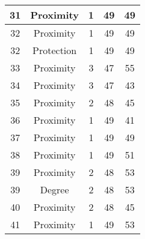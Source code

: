 \documentclass[results.tex]{subfiles}
\begin{document}
\begin{center}
\begin{tabular}{| c || c | c | c | c |}
            \hline
            31                      & Proximity                    & 1                      & 49                      & 49                   \\
            \hline
            32                      & Proximity                    & 1                      & 49                      & 49                   \\
            \hline
            32                      & Protection                   & 1                      & 49                      & 49                   \\
            \hline
            33                      & Proximity                    & 3                      & 47                      & 55                   \\
            \hline
            34                      & Proximity                    & 3                      & 47                      & 43                   \\
            \hline
            35                      & Proximity                    & 2                      & 48                      & 45                   \\
            \hline
            36                      & Proximity                    & 1                      & 49                      & 41                   \\
            \hline
            37                      & Proximity                    & 1                      & 49                      & 49                   \\
            \hline
            38                      & Proximity                    & 1                      & 49                      & 51                   \\
            \hline
            39                      & Proximity                    & 2                      & 48                      & 53                   \\
            \hline
            39                      & Degree                       & 2                      & 48                      & 53                   \\
            \hline
            40                      & Proximity                    & 2                      & 48                      & 45                   \\
            \hline
            41                      & Proximity                    & 1                      & 49                      & 53                   \\

\end{tabular}
\end{center}
\end{document}
